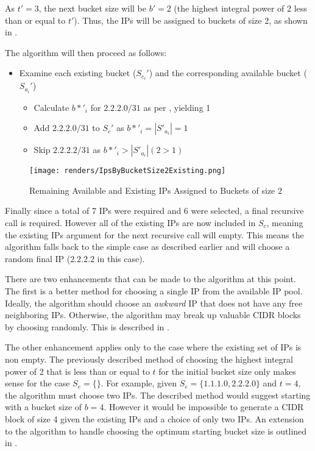 As $t'=3$, the next bucket size will be $b' = 2$ (the highest integral power of 2 less than or equal to $t'$). Thus, the IPs will be assigned to buckets of size 2, as shown in .

The algorithm will then proceed as follows:
\begin{itemize}
\item{Examine each existing bucket ($S_{e_i}'$) and the corresponding available bucket ($S_{a_i}'$)}
\begin{itemize}
\item{Calculate $b*'_i$ for $2.2.2.0/31$ as per , yielding 1}
\item{Add $2.2.2.0/31$ to $S_c'$ as $b*'_i = |S'_{a_i}| = 1$} 
\item{Skip $2.2.2.2/31$ as $b*'_i > |S'_{a_i}| (2 > 1)$}
\end{itemize}
\end{itemize}

\begin{figure}[H]
      \centering
      \texttt{[image: renders/IpsByBucketSize2Existing.png]}
      \caption{Remaining Available and Existing IPs Assigned to Buckets of size 2}
      \label{fig:ipsByBucketExisting2}
\end{figure}

Finally since a total of 7 IPs were required and 6 were selected, a final recursive call is required. However all of the existing IPs are now included in $S_c$, meaning the existing IPs argument for the next recursive call will empty. This means the algorithm falls back to the simple case as described earlier and will choose a random final IP ($2.2.2.2$ in this case). 

There are two enhancements that can be made to the algorithm at this point. The first is a better method for choosing a single IP from the available IP pool. Ideally, the algorithm should choose an \textit{awkward} IP that does not have any free neighboring IPs. Otherwise, the algorithm may break up valuable CIDR blocks by choosing randomly. This is described in . 

The other enhancement applies only to the case where the existing set of IPs is non empty. The previously described method of choosing the highest integral power of 2 that is less than or equal to $t$ for the initial bucket size only makes sense for the case $S_e = \{\}$. For example, given $S_e = \{1.1.1.0, 2.2.2.0\}$ and $t = 4$, the algorithm must choose two IPs. The described method would suggest starting with a bucket size of $b=4$. However it would be impossible to generate a CIDR block of size 4 given the existing IPs and a choice of only two IPs. An extension to the algorithm to handle choosing the optimum starting bucket size is outlined in . 

